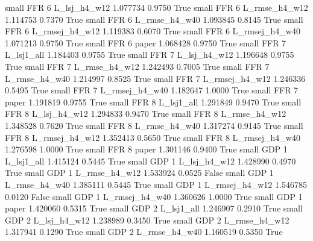      small      FFR                 6   L_lsj_h4_w12   1.077734      0.9750    True
     small      FFR                 6  L_rmse_h4_w12   1.114753      0.7370    True
     small      FFR                 6  L_rmse_h4_w40   1.093845      0.8145    True
     small      FFR                 6 L_rmsej_h4_w12   1.119383      0.6070    True
     small      FFR                 6 L_rmsej_h4_w40   1.071213      0.9750    True
     small      FFR                 6          paper   1.068428      0.9750    True
     small      FFR                 7     L_lsj1_all   1.184403      0.9755    True
     small      FFR                 7   L_lsj_h4_w12   1.196648      0.9755    True
     small      FFR                 7  L_rmse_h4_w12   1.242493      0.7005    True
     small      FFR                 7  L_rmse_h4_w40   1.214997      0.8525    True
     small      FFR                 7 L_rmsej_h4_w12   1.246336      0.5495    True
     small      FFR                 7 L_rmsej_h4_w40   1.182647      1.0000    True
     small      FFR                 7          paper   1.191819      0.9755    True
     small      FFR                 8     L_lsj1_all   1.291849      0.9470    True
     small      FFR                 8   L_lsj_h4_w12   1.294833      0.9470    True
     small      FFR                 8  L_rmse_h4_w12   1.348528      0.7620    True
     small      FFR                 8  L_rmse_h4_w40   1.317274      0.9145    True
     small      FFR                 8 L_rmsej_h4_w12   1.352413      0.5650    True
     small      FFR                 8 L_rmsej_h4_w40   1.276598      1.0000    True
     small      FFR                 8          paper   1.301146      0.9400    True
     small      GDP                 1     L_lsj1_all   1.415124      0.5445    True
     small      GDP                 1   L_lsj_h4_w12   1.428990      0.4970    True
     small      GDP                 1  L_rmse_h4_w12   1.533924      0.0525   False
     small      GDP                 1  L_rmse_h4_w40   1.385111      0.5445    True
     small      GDP                 1 L_rmsej_h4_w12   1.546785      0.0120   False
     small      GDP                 1 L_rmsej_h4_w40   1.360626      1.0000    True
     small      GDP                 1          paper   1.420060      0.5315    True
     small      GDP                 2     L_lsj1_all   1.246907      0.2910    True
     small      GDP                 2   L_lsj_h4_w12   1.238989      0.3450    True
     small      GDP                 2  L_rmse_h4_w12   1.317941      0.1290    True
     small      GDP                 2  L_rmse_h4_w40   1.160519      0.5350    True
